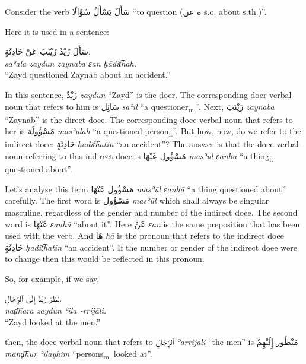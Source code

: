 \documentclass[
  10pt,
]{book}
\begin{document}
Consider the verb
\foreignlanguage{arabic}{سَأَلَ يَسْأَلُ سُؤَالًا} \enquote{to question (\foreignlanguage{arabic}{ه عن} s.o. about s.th.)}.

Here it is used in a sentence:

\foreignlanguage{arabic}{سَأَلَ زَيْدٌ زَيْنَبَ عَنْ حَادِثَةٍ.}\\
\emph{saʾala zaydun zaynaba ɛan ḥādit͡hah.}\\
\enquote{Zayd questioned Zaynab about an accident.}

In this sentence, \foreignlanguage{arabic}{زَيْدٌ} \emph{zaydun} \enquote{Zayd} is the doer. The corresponding doer verbal-noun that refers to him is \foreignlanguage{arabic}{سَائِل} \emph{sāʾil} \enquote{a questioner\textsubscript{m.}}.
Next, \foreignlanguage{arabic}{زَيْنَبَ} \emph{zaynaba} \enquote{Zaynab} is the direct doee. The corresponding doee verbal-noun that refers to her is \foreignlanguage{arabic}{مَسْؤُولَة} \emph{masʾūlah} \enquote{a questioned person\textsubscript{f.}}.
But how, now, do we refer to the indirect doee: \foreignlanguage{arabic}{حَادِثَةٍ} \emph{ḥadit͡hatin} \enquote{an accident}? The answer is that the doee verbal-noun referring to this indirect doee is \foreignlanguage{arabic}{مَسْؤُول عَنْهَا} \emph{masʾūl ɛanhā} \enquote{a thing\textsubscript{f.} questioned about}.

Let's analyze this term \foreignlanguage{arabic}{مَسْؤُول عَنْهَا} \emph{masʾūl ɛanhā} \enquote{a thing questioned about} carefully. The first word is \foreignlanguage{arabic}{مَسْؤُول} \emph{masʾūl} which shall always be singular masculine, regardless of the gender and number of the indirect doee. The second word is \foreignlanguage{arabic}{عَنْهَا} \emph{ɛanhā} \enquote{about it}. Here \foreignlanguage{arabic}{عَنْ} \emph{ɛan} is the same preposition that has been used with the verb. And \foreignlanguage{arabic}{هَا} \emph{hā} is the pronoun that refers to the indirect doee \foreignlanguage{arabic}{حَادِثَةٍ} \emph{ḥadit͡hatin} \enquote{an accident}. If the number or gender of the indirect doee were to change then this would be reflected in this pronoun.

So, for example, if we say,

\foreignlanguage{arabic}{نَظَرَ زَيْدٌ إِلَى ٱلرِّجَالِ.}\\
\emph{naḍ͡hara zaydun ʾila -rrijāli.}\\
\enquote{Zayd looked at the men.}

then, the doee verbal-noun that refers to \foreignlanguage{arabic}{ٱلرِّجَالِ} \emph{ʾarrijāli} \enquote{the men} is \foreignlanguage{arabic}{مَنْظُور إِلَيْهِمْ} \emph{manḍ͡hūr ʾilayhim} \enquote{persons\textsubscript{m.} looked at}.
\end{document}
